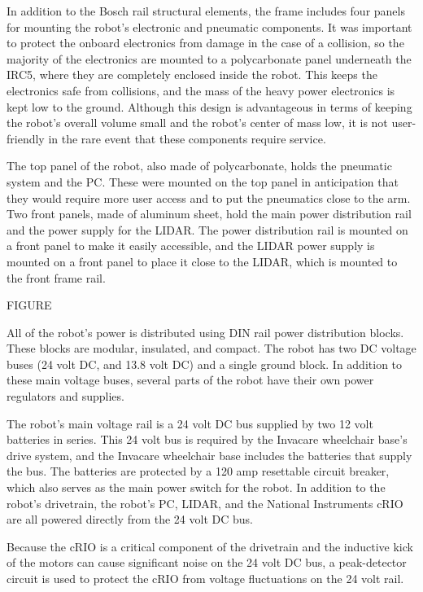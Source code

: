 \documentclass[]{cwru} %
\begin{document}
In addition to the Bosch rail structural elements, the frame includes
four panels for mounting the robot's electronic and pneumatic
components. It was important to protect the onboard electronics from
damage in the case of a collision, so the majority of the electronics
are mounted to a polycarbonate panel underneath the IRC5, where they are
completely enclosed inside the robot. This keeps the electronics safe
from collisions, and the mass of the heavy power electronics is kept low
to the ground. Although this design is advantageous in terms of keeping
the robot's overall volume small and the robot's center of mass low, it
is not user-friendly in the rare event that these components require
service.

The top panel of the robot, also made of polycarbonate, holds the
pneumatic system and the PC. These were mounted on the top panel in
anticipation that they would require more user access and to put the
pneumatics close to the arm. Two front panels, made of aluminum sheet,
hold the main power distribution rail and the power supply for the
LIDAR. The power distribution rail is mounted on a front panel to make
it easily accessible, and the LIDAR power supply is mounted on a front
panel to place it close to the LIDAR, which is mounted to the front
frame rail.

FIGURE

All of the robot's power is distributed using DIN rail power
distribution blocks. These blocks are modular, insulated, and compact.
The robot has two DC voltage buses (24 volt DC, and 13.8 volt DC) and a
single ground block. In addition to these main voltage buses, several
parts of the robot have their own power regulators and supplies.

The robot's main voltage rail is a 24 volt DC bus supplied by two 12
volt batteries in series. This 24 volt bus is required by the Invacare
wheelchair base's drive system, and the Invacare wheelchair base
includes the batteries that supply the bus. The batteries are protected
by a 120 amp resettable circuit breaker, which also serves as the main
power switch for the robot. In addition to the robot's drivetrain, the
robot's PC, LIDAR, and the National Instruments cRIO are all powered
directly from the 24 volt DC bus.

Because the cRIO is a critical component of the drivetrain and the
inductive kick of the motors can cause significant noise on the 24 volt
DC bus, a peak-detector circuit is used to protect the cRIO from voltage
fluctuations on the 24 volt rail.
\end{document}

